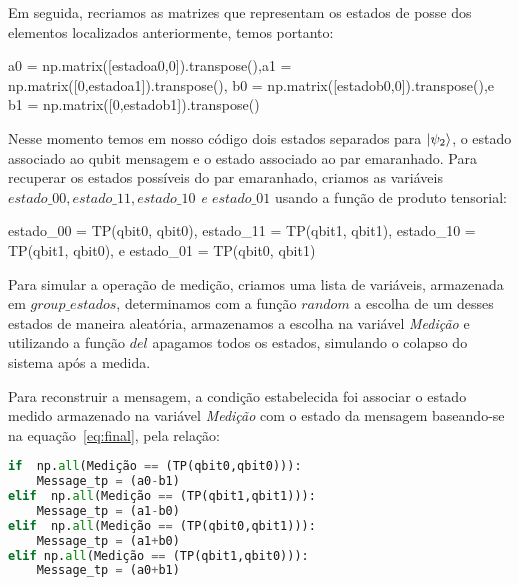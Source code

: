 Em seguida, recriamos as matrizes que representam os estados de posse dos elementos localizados anteriormente, temos portanto:

\begin{center}
\begin{tiny}a0 = np.matrix([estadoa0,0]).transpose(),a1 = np.matrix([0,estadoa1]).transpose(),\linebreak
b0 = np.matrix([estadob0,0]).transpose(),\text e \quad b1 = np.matrix([0,estadob1]).transpose()\end{tiny}
\end{center}

Nesse momento temos em nosso código dois estados separados para $\ket{\psi_2}$, o estado associado ao qubit mensagem e o estado associado ao par emaranhado. Para recuperar os estados possíveis do par emaranhado, criamos as variáveis \textit{$estado\_00, estado\_11, estado\_10$ e $estado\_01$} usando a função de produto tensorial:

\begin{center}
\begin{tiny}estado\_00 = TP(qbit0, qbit0), estado\_11 = TP(qbit1, qbit1),\linebreak
estado\_10 = TP(qbit1, qbit0), \text e \quad estado\_01 = TP(qbit0, qbit1)\end{tiny}
\end{center}

Para simular a operação de medição, criamos uma lista de variáveis, armazenada em \textit{$group\_estados$}, determinamos com a função \textit{$random$} a escolha de um desses estados de maneira aleatória, armazenamos a escolha na variável \textit{Medição} e utilizando a função \textit{$del$} apagamos todos os estados, simulando o colapso do sistema após a medida.

Para reconstruir a mensagem, a condição estabelecida foi associar o estado medido armazenado na variável \textit{Medição} com o estado da mensagem baseando-se na equação~\eqref{eq:final}, pela relação:
\begin{center}


\begin{lstlisting}[language=Python, caption=Relação de condição para a mensagem em função do estado medido.]
if  np.all(Medição == (TP(qbit0,qbit0))):
    Message_tp = (a0-b1)
elif  np.all(Medição == (TP(qbit1,qbit1))):
    Message_tp = (a1-b0)
elif  np.all(Medição == (TP(qbit0,qbit1))):
    Message_tp = (a1+b0)
elif np.all(Medição == (TP(qbit1,qbit0))):
    Message_tp = (a0+b1)
\end{lstlisting}
\end{center}

